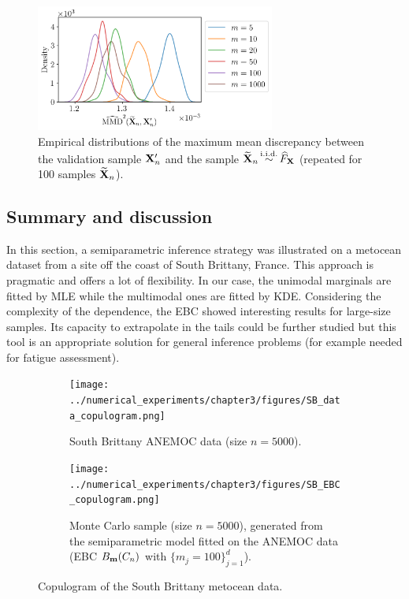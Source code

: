 \begin{figure}[h]
    \centering
    \includegraphics[width=0.7\textwidth]{../numerical_experiments/chapter3/figures/SB_MMD_goodness.png}
    \caption{Empirical distributions of the maximum mean discrepancy between the validation sample ${\bf X}_n'$ and the sample $\widetilde{{\bf X}}_n \mathop{\sim}\limits^{\mathrm{i.i.d.}} \widehat{F}_{\bf X}$ (repeated for 100 samples $\widetilde{{\bf X}}_n$).}
    \label{fig:sb_ebc_mmd}
\end{figure}


\subsection{Summary and discussion}
In this section, a semiparametric inference strategy was illustrated on a metocean dataset from a site off the coast of South Brittany, France. 
This approach is pragmatic and offers a lot of flexibility. 
In our case, the unimodal marginals are fitted by MLE while the multimodal ones are fitted by KDE. 
Considering the complexity of the dependence, the EBC showed interesting results for large-size samples. 
Its capacity to extrapolate in the tails could be further studied \citep{heredia_2022_nonparam_copula} but this tool is an appropriate solution for general inference problems (for example needed for fatigue assessment). 

\begin{landscape}
    \begin{figure}
        \begin{subfigure}[b]{0.49\linewidth}
            \centering
            \texttt{[image: ../numerical\_experiments/chapter3/figures/SB\_data\_copulogram.png]}
            \vspace*{2pt}
            \caption{South Brittany ANEMOC data (size $n=5000$).}
        \end{subfigure}
        \begin{subfigure}[b]{0.49\linewidth}
            \centering
            \texttt{[image: ../numerical\_experiments/chapter3/figures/SB\_EBC\_copulogram.png]}
            \caption{Monte Carlo sample (size $n=5000$), generated from the semiparametric model fitted on the ANEMOC data (EBC $B_{{\bf m}}(C_n)$ with $ \{m_j=100\}_{j=1}^d$).}
        \end{subfigure}
        \vspace*{5pt} 
        \caption{Copulogram of the South Brittany metocean data.}
        \label{fig:sb_copulograms}
    \end{figure}
\end{landscape}






